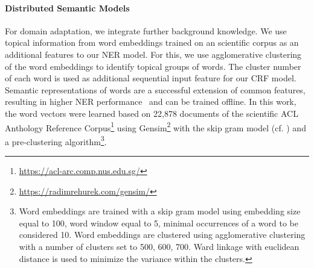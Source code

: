\paragraph{Distributed Semantic Models}%
\label{subsec:dist-model}
For domain adaptation, we integrate further background knowledge.
We use topical information from word embeddings trained on an scientific corpus as an additional features to our NER model.
For this, we use agglomerative clustering of the word embeddings to identify topical groups of words.
The cluster number of each word is used as additional sequential input feature for our CRF model.
Semantic representations of words are a successful extension of common features, resulting in higher NER performance~\cite{Turian} and can be trained offline.
In this work, the word vectors were learned based on 22,878 documents of the scientific ACL Anthology Reference Corpus\footnote{\url{https://acl-arc.comp.nus.edu.sg/}} using Gensim\footnote{\url{https://radimrehurek.com/gensim/}} with the skip gram model (cf. \cite{mikolov2013distributed}) 
and a pre-clustering algorithm\footnote{
Word embeddings are trained with a skip gram model using embedding size equal to 100, word window equal to 5, minimal occurrences of a word to be considered 10. Word embeddings are clustered using agglomerative clustering with a number of clusters set to {500, 600, 700}. Ward linkage with euclidean distance is used to minimize the variance within the clusters.}.

